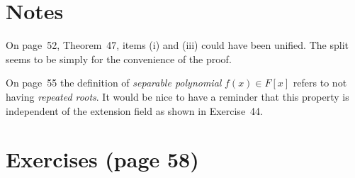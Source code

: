 
\section{Notes}

On page~52, Theorem~47, items  (i) and (iii) could have been unified.
The split seems to be simply for the convenience of the proof.

On page~55 the definition of
\emph{separable polynomial} \(f(x)\in F[x]\) refers to not having
\emph{repeated roots}.
It would be nice to have a reminder that this property
is independent of the extension field as shown
in Exercise~44.

\section{Exercises (page 58)}

